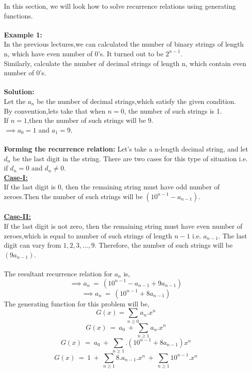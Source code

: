 In this section, we will look how to solve recurrence relations using generating functions.
\\ \\
\textbf{Example 1:}\\
In the previous lectures,we can calculated the number of binary strings of length n, which have even number of $0$'s. It turned out to be $2^{n-1}$.\\
Similarly, calculate the number of decimal strings of length n, which contain even number of $0$'s.\\ \\
\textbf{Solution:}\\
Let the $a_n$ be the number of decimal strings,which satisfy the given condition.\\
By convention,lets take that when $n=0$, the number of such strings is 1.\\
If $n=1$,then the number of such strings will be 9.\\
$\implies a_0=1$ and $a_1=9$.\\ \\
\textbf{Forming the recurrence relation:}
Let's take a n-length decimal string, and let $d_n$ be the last digit in the string. There are two cases for this type of situation i.e. if $d_n=0$ and $d_n \neq 0$.\\
\underline{\textbf{Case-\RN{1}:}} \\If the last digit is 0, then the remaining string must have odd number of zeroes.Then the number of such strings will be $(10^{n-1} - a_{n-1})$.\\ \\
\underline{\textbf{Case-\RN{2}:}}\\
If the last digit is not zero, then the remaining string must have even number of zeroes,which is equal to number of such strings of length $n-1$ i.e. $a_{n-1}$. The last digit can vary from $1,2,3, \dots,9$. Therefore, the number of such strings will be $(9a_{n-1})$.\\ \\
The resultant recurrence relation for $a_n$ is,\\
$$\implies a_n~=~(10^{n-1}-a_{n-1}+9a_{n-1})$$
$$\implies a_n~=~(10^{n-1}+8a_{n-1})$$
The generating function for this problem will be,
\begin{equation}
G(x) = \sum_{n \geq 0} a_n.x^n
\end{equation}
$$ G(x)~=~a_0~+~\sum_{n \geq 1}a_n.x^n $$
$$ G(x)~=~a_0~+~\sum_{n \geq 1}.(10^{n-1}+8a_{n-1})x^n$$
$$ G(x)~=~1~+~\sum_{n \geq 1} 8.a_{n-1}.x^n~+~\sum_{n \geq 1}10^{n-1}.x^n $$

